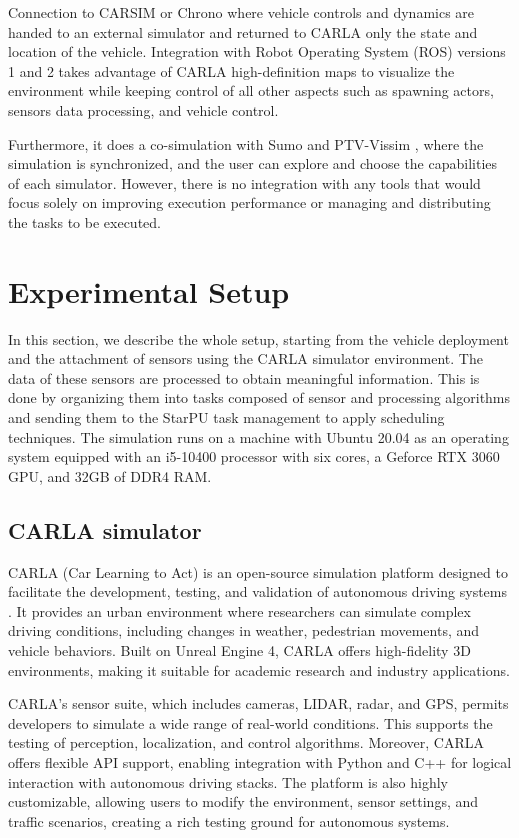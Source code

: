 \documentclass[conference]{IEEEtran}
\begin{document}
Connection to CARSIM \cite{carsim} or Chrono \cite{chrono} where vehicle controls and dynamics are handed to an external simulator and returned to CARLA only the state and location of the vehicle. Integration with Robot Operating System (ROS) \cite{ros} versions 1 and 2 takes advantage of CARLA high-definition maps to visualize the environment while keeping control of all other aspects such as spawning actors, sensors data processing, and vehicle control. 

Furthermore, it does a co-simulation with Sumo \cite{sumo} and PTV-Vissim \cite{ptv_vissim}, where the simulation is synchronized, and the user can explore and choose the capabilities of each simulator. However, there is no integration with any tools that would focus solely on improving execution performance or managing and distributing the tasks to be executed.


\section{Experimental Setup}
In this section, we describe the whole setup, starting from the vehicle deployment and the attachment of sensors using the CARLA simulator environment. The data of these sensors are processed to obtain meaningful information. This is done by organizing them into tasks composed of sensor and processing algorithms and sending them to the StarPU task management to apply scheduling techniques. The simulation runs on a machine with Ubuntu 20.04 as an operating system equipped with an i5-10400 processor with six cores, a Geforce RTX 3060 GPU, and 32GB of DDR4 RAM.

\subsection{CARLA simulator}
CARLA (Car Learning to Act) is an open-source simulation platform designed to facilitate the development, testing, and validation of autonomous driving systems \cite{Dosovitskiy2017}. It provides an urban environment where researchers can simulate complex driving conditions, including changes in weather, pedestrian movements, and vehicle behaviors. Built on Unreal Engine 4, CARLA offers high-fidelity 3D environments, making it suitable for academic research and industry applications. %

CARLA's sensor suite, which includes cameras, LIDAR, radar, and GPS, permits developers to simulate a wide range of real-world conditions. This supports the testing of perception, localization, and control algorithms. Moreover, CARLA offers flexible API support, enabling integration with Python and C++ for logical interaction with autonomous driving stacks. The platform is also highly customizable, allowing users to modify the environment, sensor settings, and traffic scenarios, creating a rich testing ground for autonomous systems.
\end{document}
